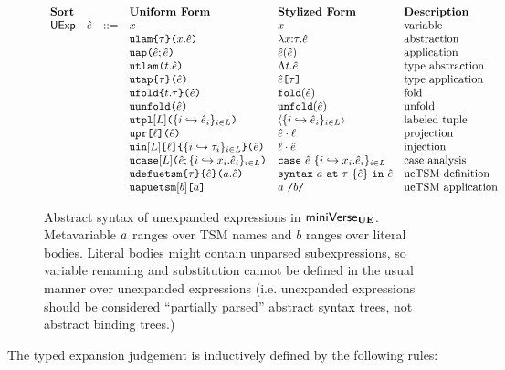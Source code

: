 \begin{figure}
\hspace{-5px}$\begin{array}{lllllll}
\textbf{Sort} & & & \textbf{Uniform Form} & \textbf{Stylized Form} & \textbf{Description}\\
\mathsf{UExp} & \hat{e} & ::= & x & x & \text{variable}\\
&&& \texttt{ulam}\texttt{\{}\tau\texttt{\}(}x.\hat{e}\texttt{)} & \lambda x{:}\tau.\hat{e} & \text{abstraction}\\
&&& \texttt{uap}\texttt{(}\hat{e}; \hat{e}\texttt{)} & \hat{e}(\hat{e}) & \text{application}\\
&&& \texttt{utlam}\texttt{(}t.\hat{e}\texttt{)} & \Lambda t.\hat{e} & \text{type abstraction}\\
&&& \texttt{utap}\texttt{\{}\tau\texttt{\}(}\hat{e}\texttt{)} & \hat{e}\texttt{[}\tau\texttt{]} & \text{type application}\\
&&& \texttt{ufold}\texttt{\{}t.\tau\texttt{\}(}\hat{e}\texttt{)} & \texttt{fold}(\hat{e}) & \text{fold}\\
&&& \texttt{uunfold}\texttt{(}\hat{e}\texttt{)} & \texttt{unfold}(\hat{e}) & \text{unfold}\\
&&& \texttt{utpl}[L]\texttt{(}\{i \hookrightarrow \hat{e}_{i}\}_{i \in L}\texttt{)} & \langle \{i \hookrightarrow \hat{e}_{i}\}_{i \in L}\rangle & \text{labeled tuple}\\
&&& \texttt{upr}\texttt{[}\ell\texttt{](}\hat{e}\texttt{)} & \hat{e} \cdot \ell & \text{projection}\\
&&& \texttt{uin}[L]\texttt{[}\ell\texttt{]\{}\{i \hookrightarrow \tau_{i}\}_{i \in L}\texttt{\}(}\hat{e}\texttt{)} & \ell \cdot \hat{e} & \text{injection}\\
&&& \texttt{ucase}[L]\texttt{(}\hat{e}; \{i \hookrightarrow x_{i}.\hat{e}_{i}\}_{i \in L}\texttt{)} & \texttt{case}~\hat{e}~\{i \hookrightarrow x_{i}.\hat{e}_{i}\}_{i \in L} & \text{case analysis}\\
&&& \texttt{udefuetsm}\texttt{\{}\tau\texttt{\}\{}\hat{e}\texttt{\}(}a.\hat{e}\texttt{)} & \texttt{syntax}~a~\texttt{at}~\tau~\{\hat{e}\}~\texttt{in}~\hat{e} & \text{ueTSM definition}\\
&&& \texttt{uapuetsm}[b]\texttt{[}a\texttt{]} & a~\texttt{/}b\texttt{/} & \text{ueTSM application}
\end{array}$
\caption[Syntax of unexpanded expressions in $\miniVerseUE$]{Abstract syntax of unexpanded expressions in $\miniVerseUE$. Metavariable $a$ ranges over TSM names and $b$ ranges over literal bodies. Literal bodies might contain unparsed subexpressions, so variable renaming and substitution cannot be defined in the usual manner over unexpanded expressions (i.e. unexpanded expressions should be considered ``partially parsed'' abstract syntax trees, not abstract binding trees.)}
\label{fig:U-unexpanded-terms}
\end{figure}
\noindent
The typed expansion judgement is inductively defined by the following rules:
